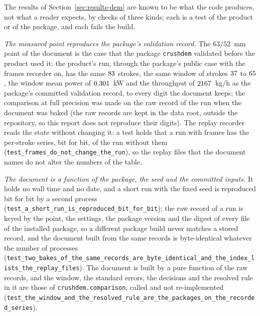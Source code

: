 The results of Section~\ref{sec:results-dem} are known to be what the code produces, not what a reader expects, by checks of three kinds; each is a test of the product or of the package, and each fails the build.

\emph{The measured point reproduces the package's validation record.} The $63/52$~mm point of the document is the case that the package \texttt{crushdem} validated before the product used it: the product's run, through the package's public case with the frames recorder on, has the same $83$ strokes, the same window of strokes $37$ to $65$, the window mean power of $0.301$~kW and the throughput of $2167$~kg/h as the package's committed validation record, to every digit the document keeps; the comparison at full precision was made on the raw record of the run when the document was baked (the raw records are kept in the data root, outside the repository, so this report does not reproduce their digits). The replay recorder reads the state without changing it: a test holds that a run with frames has the per-stroke series, bit for bit, of the run without them (\texttt{test\_frames\_do\_not\_change\_the\_run}), so the replay files that the document names do not alter the numbers of the table.

\emph{The document is a function of the package, the seed and the committed inputs.} It holds no wall time and no date, and a short run with the fixed seed is reproduced bit for bit by a second process (\texttt{test\_a\_short\_run\_is\_reproduced\_bit\_for\_bit}); the raw record of a run is keyed by the point, the settings, the package version and the digest of every file of the installed package, so a different package build never matches a stored record, and the document built from the same records is byte-identical whatever the number of processes (\texttt{test\_two\_bakes\_of\_the\_same\_records\_are\_byte\_identical\_and\_the\_index\_lists\_the\_replay\_files}). The document is built by a pure function of the raw records, and the window, the standard errors, the decisions and the resolved rule in it are those of \texttt{crushdem.comparison}, called and not re-implemented (\texttt{test\_the\_window\_and\_the\_resolved\_rule\_are\_the\_packages\_on\_the\_recorded\_series}).

